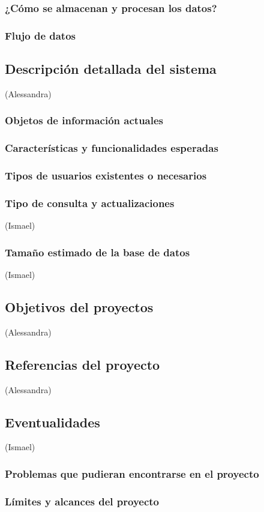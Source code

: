 \subsubsection{¿Cómo se almacenan y procesan los datos?}
\subsubsection{Flujo de datos}
\subsection{Descripción detallada del sistema} (Alessandra)
\subsubsection{Objetos de información actuales}
\subsubsection{Características y funcionalidades esperadas}
\subsubsection{Tipos de usuarios existentes o necesarios}
\subsubsection{Tipo de consulta y actualizaciones} (Ismael)
\subsubsection{Tamaño estimado de la base de datos} (Ismael)
\subsection{Objetivos del proyectos} (Alessandra)
\subsection{Referencias del proyecto} (Alessandra)
\subsection{Eventualidades} (Ismael)
\subsubsection{Problemas que pudieran encontrarse en el proyecto}
\subsubsection{Límites y alcances del proyecto}